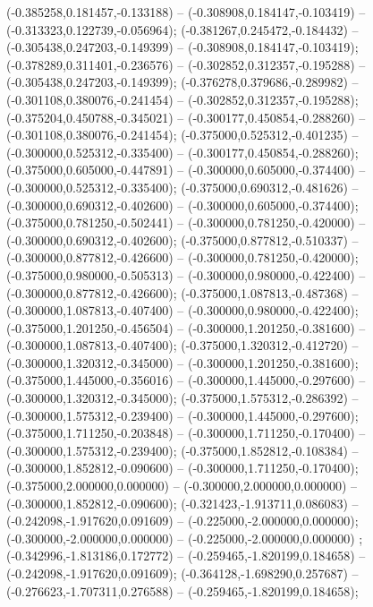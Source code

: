  (-0.385258,0.181457,-0.133188) -- (-0.308908,0.184147,-0.103419) -- (-0.313323,0.122739,-0.056964);
 (-0.381267,0.245472,-0.184432) -- (-0.305438,0.247203,-0.149399) -- (-0.308908,0.184147,-0.103419);
 (-0.378289,0.311401,-0.236576) -- (-0.302852,0.312357,-0.195288) -- (-0.305438,0.247203,-0.149399);
 (-0.376278,0.379686,-0.289982) -- (-0.301108,0.380076,-0.241454) -- (-0.302852,0.312357,-0.195288);
 (-0.375204,0.450788,-0.345021) -- (-0.300177,0.450854,-0.288260) -- (-0.301108,0.380076,-0.241454);
 (-0.375000,0.525312,-0.401235) -- (-0.300000,0.525312,-0.335400) -- (-0.300177,0.450854,-0.288260);
 (-0.375000,0.605000,-0.447891) -- (-0.300000,0.605000,-0.374400) -- (-0.300000,0.525312,-0.335400);
 (-0.375000,0.690312,-0.481626) -- (-0.300000,0.690312,-0.402600) -- (-0.300000,0.605000,-0.374400);
 (-0.375000,0.781250,-0.502441) -- (-0.300000,0.781250,-0.420000) -- (-0.300000,0.690312,-0.402600);
 (-0.375000,0.877812,-0.510337) -- (-0.300000,0.877812,-0.426600) -- (-0.300000,0.781250,-0.420000);
 (-0.375000,0.980000,-0.505313) -- (-0.300000,0.980000,-0.422400) -- (-0.300000,0.877812,-0.426600);
 (-0.375000,1.087813,-0.487368) -- (-0.300000,1.087813,-0.407400) -- (-0.300000,0.980000,-0.422400);
 (-0.375000,1.201250,-0.456504) -- (-0.300000,1.201250,-0.381600) -- (-0.300000,1.087813,-0.407400);
 (-0.375000,1.320312,-0.412720) -- (-0.300000,1.320312,-0.345000) -- (-0.300000,1.201250,-0.381600);
 (-0.375000,1.445000,-0.356016) -- (-0.300000,1.445000,-0.297600) -- (-0.300000,1.320312,-0.345000);
 (-0.375000,1.575312,-0.286392) -- (-0.300000,1.575312,-0.239400) -- (-0.300000,1.445000,-0.297600);
 (-0.375000,1.711250,-0.203848) -- (-0.300000,1.711250,-0.170400) -- (-0.300000,1.575312,-0.239400);
 (-0.375000,1.852812,-0.108384) -- (-0.300000,1.852812,-0.090600) -- (-0.300000,1.711250,-0.170400);
 (-0.375000,2.000000,0.000000) -- (-0.300000,2.000000,0.000000) -- (-0.300000,1.852812,-0.090600);
 (-0.321423,-1.913711,0.086083) -- (-0.242098,-1.917620,0.091609) -- (-0.225000,-2.000000,0.000000);
 (-0.300000,-2.000000,0.000000) -- (-0.225000,-2.000000,0.000000) ;
 (-0.342996,-1.813186,0.172772) -- (-0.259465,-1.820199,0.184658) -- (-0.242098,-1.917620,0.091609);
 (-0.364128,-1.698290,0.257687) -- (-0.276623,-1.707311,0.276588) -- (-0.259465,-1.820199,0.184658);
